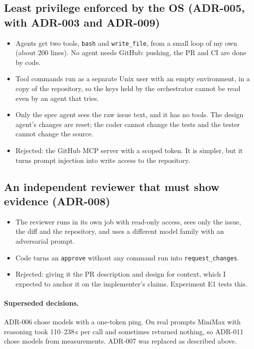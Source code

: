 \documentclass[11pt,a4paper]{article}
\newcommand{\code}[1]{\texttt{#1}}
\begin{document}
\subsection{Least privilege enforced by the OS (ADR-005, with ADR-003 and ADR-009)}
\begin{itemize}
  \item Agents get two tools, \code{bash} and \code{write\_file}, from a small loop of my own (about 200
        lines). No agent needs GitHub: pushing, the PR and CI are done by code.
  \item Tool commands run as a separate Unix user with an empty environment, in a copy of the repository,
        so the keys held by the orchestrator cannot be read even by an agent that tries.
  \item Only the spec agent sees the raw issue text, and it has no tools. The design agent's changes are
        reset; the coder cannot change the tests and the tester cannot change the source.
  \item Rejected: the GitHub MCP server with a scoped token. It is simpler, but it turns prompt injection
        into write access to the repository.
\end{itemize}

\subsection{An independent reviewer that must show evidence (ADR-008)}
\begin{itemize}
  \item The reviewer runs in its own job with read-only access, sees only the issue, the diff and the
        repository, and uses a different model family with an adversarial prompt.
  \item Code turns an \code{approve} without any command run into \code{request\_changes}.
  \item Rejected: giving it the PR description and design for context, which I expected to anchor it on
        the implementer's claims. Experiment E1 tests this.
\end{itemize}

\paragraph{Superseded decisions.} ADR-006 chose models with a one-token ping. On real prompts MiniMax with
reasoning took 110--238\,s per call and sometimes returned nothing, so ADR-011 chose models from
measurements. ADR-007 was replaced as described above.
\end{document}
